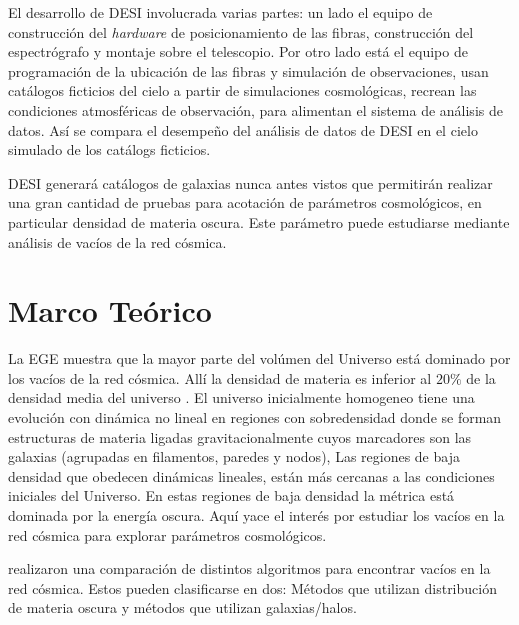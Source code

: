 \documentclass[preprint]{aastex62}
\begin{document}
  El desarrollo de DESI involucrada varias partes: un lado el equipo de construcción
  del \textit{hardware} de posicionamiento de las fibras, construcción del espectrógrafo y
  montaje sobre el telescopio. Por otro lado está el equipo de programación de la ubicación
  de las fibras y simulación de observaciones, usan catálogos ficticios del cielo a
  partir de simulaciones cosmológicas, recrean las condiciones atmosféricas 
  de observación, para alimentan el sistema
  de análisis de datos. 
  Así se compara el desempeño del análisis de datos de DESI en el
  cielo simulado de los cat\'alogs ficticios. 

  DESI generará catálogos de galaxias nunca antes vistos 
  que permitirán realizar una gran cantidad de pruebas para acotación de parámetros cosmológicos,
  en particular densidad de materia oscura. Este parámetro puede estudiarse mediante análisis
  de vacíos de la red cósmica.


  \section{Marco Teórico}

  La EGE muestra que la mayor parte del volúmen del Universo está dominado
  por los vacíos de la red cósmica. Allí la densidad de materia es inferior al $20\%$ de la
  densidad media del universo \citep{Weygaert2014}.
  El universo inicialmente homogeneo tiene una evolución con dinámica no lineal en regiones
  con sobredensidad donde se forman estructuras  de materia ligadas gravitacionalmente
  cuyos marcadores son las galaxias (agrupadas en filamentos, paredes y nodos),
  Las regiones de baja densidad que obedecen dinámicas lineales, están más cercanas a
  las condiciones iniciales del Universo. En estas regiones de baja densidad la métrica está
  dominada por la energía oscura. Aquí yace el interés por estudiar los vacíos en la
  red cósmica para explorar parámetros cosmológicos.
  
  \citet{Aspen-Amsterdam2008} realizaron una comparación de distintos algoritmos para encontrar vacíos
  en la red cósmica. Estos pueden clasificarse en dos: Métodos que utilizan distribución de materia
  oscura y métodos que utilizan galaxias/halos.
\end{document}
